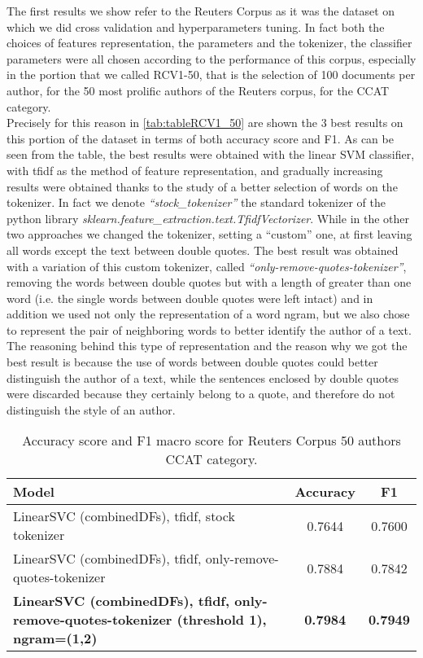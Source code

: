 The first results we show refer to the Reuters Corpus as it was the dataset on which we did cross validation and hyperparameters tuning. In fact both the choices of features representation, the parameters and the tokenizer, the classifier parameters were all chosen according to the performance of this corpus, especially in the portion that we called RCV1-50, that is the selection of 100 documents per author, for the 50 most prolific authors of the Reuters corpus, for the CCAT category.\\
Precisely for this reason in \autoref{tab:tableRCV1_50} are shown the 3 best results on this portion of the dataset in terms of both accuracy score and F1. As can be seen from the table, the best results were obtained with the linear SVM classifier, with tfidf as the method of feature representation, and gradually increasing results were obtained thanks to the study of a better selection of words on the tokenizer.
In fact we denote \textit{\enquote{stock\_tokenizer}} the standard tokenizer of the python library 
\textit{sklearn.feature\_extraction.text.TfidfVectorizer}. While in the other two approaches we changed the tokenizer, setting a \enquote{custom} one, at first leaving all words except the text between double quotes. The best result was obtained with a variation of this custom tokenizer, called \textit{\enquote{only-remove-quotes-tokenizer}}, removing the words between double quotes but with a length of greater than one word (i.e. the single words between double quotes were left intact) and in addition we used not only the representation of a word ngram, but we also chose to represent the pair of neighboring words to better identify the author of a text.
The reasoning behind this type of representation and the reason why we got the best result is because the use of words between double quotes could better distinguish the author of a text, while the sentences enclosed by double quotes were discarded because they certainly belong to a quote, and therefore do not distinguish the style of an author.


\begin{table}[h!]
	\begin{center}  
		\caption[Reuters Corpus Results - 50 authors]{Accuracy score and F1 macro score for Reuters Corpus 50 authors CCAT category.} 
		\label{tab:tableRCV1_50}
		\begin{tabular}{| p{5 cm} | c | c |}
			\hline 
			Model & Accuracy & F1\\
			\hline
			LinearSVC (combinedDFs), tfidf, stock tokenizer & 0.7644 & 0.7600 \\ \hline
			LinearSVC (combinedDFs), tfidf, only-remove-quotes-tokenizer & 0.7884 & 0.7842 \\ \hline
			\textbf{LinearSVC (combinedDFs), tfidf, only-remove-quotes-tokenizer (threshold 1),
			ngram=(1,2)} & \textbf{0.7984} & \textbf{0.7949} \\ \hline
		\end{tabular} 
	\end{center}
\end{table}


